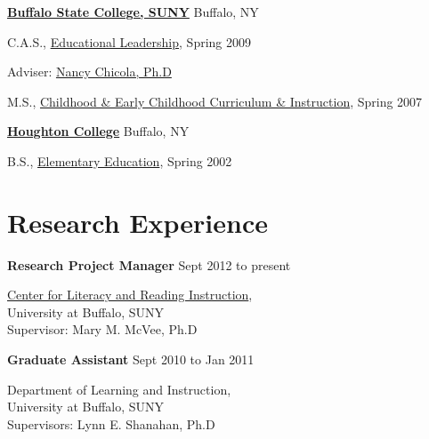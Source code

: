 \href{http://www.buffalostate.edu/}{\textbf{Buffalo State College, SUNY}}
Buffalo, NY
\begin{outerlist}

\item[] C.A.S.,
        \href{http://www.buffalostate.edu/gradprog.xml?bpid=27}
             {Educational Leadership},
             Spring 2009
        \begin{innerlist}
        \item Adviser:
              \href{http://elementaryeducation.buffalostate.edu/faculty/nancy-chicola}
                   {Nancy Chicola, Ph.D}
        \end{innerlist}
\end{outerlist}
\vspace{.1in}

\begin{outerlist}

\item[] M.S.,
        \href{http://www.buffalostate.edu/gradprog.xml?bpid=27}
             {Childhood \& Early Childhood Curriculum \& Instruction},
             Spring 2007
\end{outerlist}
\vspace{.1in}

\href{http://www.houghton.edu/}{\textbf{Houghton College}}
Buffalo, NY
\begin{outerlist}

\item[] B.S.,
        \href{http://www.houghton.edu/education/}
             {Elementary Education},
             Spring 2002
\end{outerlist}
\vspace{.1in}


\section{Research Experience}

\textbf{Research Project Manager} \hfill {Sept 2012 to present}
\begin{innerlist}

\item[] \href{http://clari.buffalo.edu}{Center for Literacy and Reading Instruction},\\
        University at Buffalo, SUNY\\
        Supervisor: Mary M. McVee, Ph.D
\end{innerlist}

\textbf{Graduate Assistant} \hfill {Sept 2010 to Jan 2011}
\begin{innerlist}

\item[] Department of Learning and Instruction,\\
        University at Buffalo, SUNY\\
        Supervisors: Lynn E. Shanahan, Ph.D
\end{innerlist}

